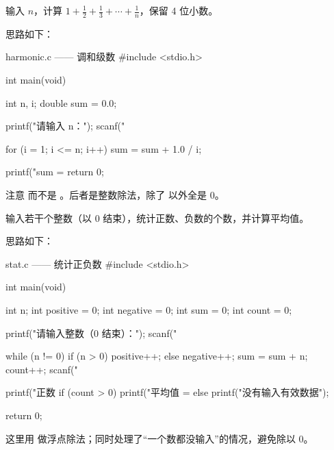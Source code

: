 \begin{example}
输入 $n$，计算 $1 + \frac{1}{2} + \frac{1}{3} + \cdots + \frac{1}{n}$，保留 4 位小数。
\end{example}
\begin{solution}
思路如下：

\begin{codebox}{harmonic.c —— 调和级数}
#include <stdio.h>

int main(void)
{
    int n, i;
    double sum = 0.0;

    printf("请输入 n：");
    scanf("%

    for (i = 1; i <= n; i++) {
        sum = sum + 1.0 / i;
    }

    printf("sum = %
    return 0;
}
\end{codebox}

注意  而不是 。后者是整数除法，除了  以外全是 0。
\end{solution}

\begin{example}
输入若干个整数（以 0 结束），统计正数、负数的个数，并计算平均值。
\end{example}
\begin{solution}
思路如下：

\begin{codebox}{stat.c —— 统计正负数}
#include <stdio.h>

int main(void)
{
    int n;
    int positive = 0;
    int negative = 0;
    int sum = 0;
    int count = 0;

    printf("请输入整数（0 结束）：");
    scanf("%

    while (n != 0) {
        if (n > 0) {
            positive++;
        } else {
            negative++;
        }
        sum = sum + n;
        count++;
        scanf("%
    }

    printf("正数 %
    if (count > 0) {
        printf("平均值 = %
    } else {
        printf("没有输入有效数据\n");
    }

    return 0;
}
\end{codebox}

这里用  做浮点除法；同时处理了“一个数都没输入”的情况，避免除以 0。
\end{solution}


